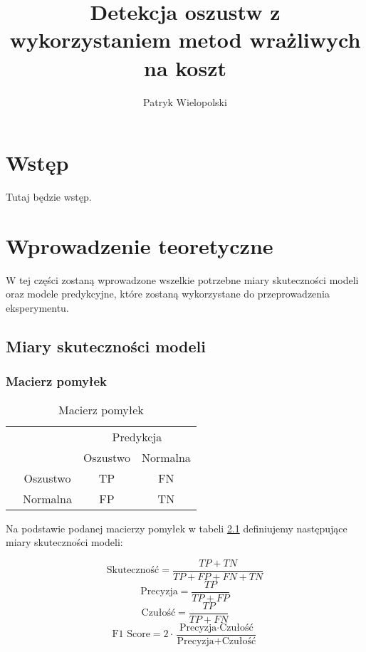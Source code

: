 \documentclass{book}
\title{Detekcja oszustw z wykorzystaniem metod wrażliwych na koszt}
\author{Patryk Wielopolski}
\begin{document}
\maketitle

\chapter{Wstęp}
Tutaj będzie wstęp.

\chapter{Wprowadzenie teoretyczne}

W tej części zostaną wprowadzone wszelkie potrzebne miary skuteczności modeli oraz modele predykcyjne, które zostaną wykorzystane do przeprowadzenia eksperymentu. 

\section{Miary skuteczności modeli}

\subsection{Macierz pomyłek}


\begin{table}
	\begin{center}
		\makegapedcells
		\begin{tabular}{cc|cc}
			\multicolumn{2}{c}{}     &   \multicolumn{2}{c}{Predykcja} \\
			&            &   Oszustwo &   Normalna     \\ 
			\cline{2-4}
			\multirow{2}{*}{\rotatebox[origin=c]{90}{Prawda}} & Oszustwo   & TP         & FN              \\
			& Normalna   & FP         & TN              \\ 
			\cline{2-4}
		\end{tabular}
	\end{center}
	\caption{Macierz pomyłek}
	\label{macierz-pomylek}
\end{table}


Na podstawie podanej macierzy pomyłek w tabeli \ref{macierz-pomylek} definiujemy następujące miary skuteczności modeli:

$$ \text{Skuteczność} = \frac{TP + TN}{TP + FP + FN + TN} $$
$$ \text{Precyzja} = \frac{TP}{TP + FP} $$
$$ \text{Czułość}= \frac{TP}{TP + FN} $$
$$ \text{F1 Score} = 2 \cdot \frac{\text{Precyzja} \cdot \text{Czułość}}{\text{Precyzja} + \text{Czułość}} $$
\end{document}
